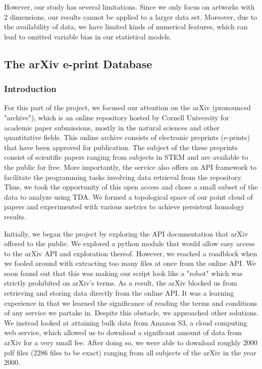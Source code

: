 \documentclass[12pt]{article}
\theoremstyle{definition}
\begin{document}
However, our study has several limitations. Since we only focus on artworks with 2 dimensions, our results cannot be applied to a larger data set. Moreover, due to the availability of data, we have limited kinds of numerical features, which can lead to omitted variable bias in our statistical models.

\subsection{The arXiv e-print Database}

\subsubsection{Introduction}

\par For this part of the project, we focused our attention on the arXiv (pronounced  "archive"), which is an online repository hosted by Cornell University for academic paper submissions, mostly in the natural sciences and other quantitative fields. This online archive consists of electronic preprints (e-prints) that have been approved for publication. The subject of the these preprints consist of scientific papers ranging from subjects in STEM and are available to the public for free. More importantly, the service also offers an API framework to facilitate the programming tasks involving data retrieval from the repository. Thus, we took the opportunity of this open access and chose a small subset of the data to analyze using TDA. We formed a topological space of our point cloud of papers and experimented with various metrics to achieve persistent homology results. 
\newline
\par Initially, we began the project by exploring the API documentation that arXiv offered to the public. We explored a python module that would allow easy access to the arXiv API and exploration thereof. However, we reached a roadblock when we fooled around with extracting too many files at once from the online API. We soon found out that this was making our script look like a "robot" which was strictly prohibited on arXiv's terms. As a result, the arXiv blocked us from retrieving and storing data directly from the online API. It was a learning experience in that we learned the significance of reading the terms and conditions of any service we partake in. Despite this obstacle, we approached other solutions. We instead looked at attaining bulk data from Amazon S3, a cloud computing web service, which allowed us to download a significant amount of data from arXiv for a very small fee. After doing so, we were able to download roughly 2000 pdf files (2286 files to be exact) ranging from all subjects of the arXiv in the year 2000. 
\end{document}
